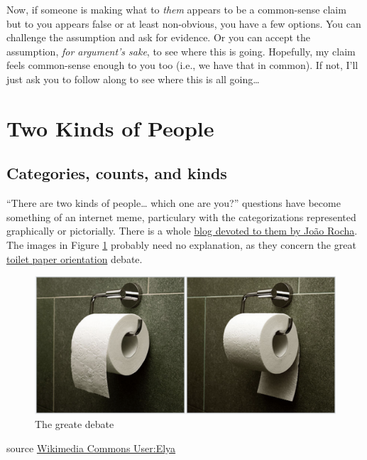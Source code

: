 \documentclass[]{book}
\begin{document}
Now, if someone is making what to \emph{them} appears to be a common-sense claim but to you appears false or at least non-obvious, you have a few options. You can challenge the assumption and ask for evidence. Or you can accept the assumption, \emph{for argument's sake}, to see where this is going. Hopefully, my claim feels common-sense enough to you too (i.e., we have that in common). If not, I'll just ask you to follow along to see where this is all going\ldots{}

\hypertarget{two-kinds-of-people}{%
\section{Two Kinds of People}\label{two-kinds-of-people}}

\hypertarget{sec:categories}{%
\subsection{Categories, counts, and kinds}\label{sec:categories}}

``There are two kinds of people\ldots{} which one are you?'' questions have become something of an internet meme, particulary with the categorizations represented graphically or pictorially. There is a whole \href{https://2kindsofpeople.tumblr.com/}{blog devoted to them by João Rocha}. The images in Figure \ref{fig:tp-fig} probably need no explanation, as they concern the great \href{https://en.wikipedia.org/wiki/Toilet_paper_orientation}{toilet paper orientation} debate.

\begin{figure}
\includegraphics[width=0.9\linewidth]{images/Toilet_paper_orientation_overunder} \caption{The greate debate}\label{fig:tp-fig}
\end{figure}

source \href{https://commons.wikimedia.org/wiki/File:Toilet_paper_orientation_over.jpg}{Wikimedia Commons User:Elya}
\end{document}
